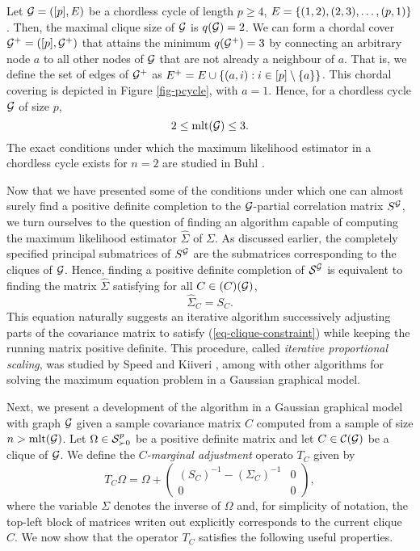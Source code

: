 \begin{example} \label{ex-pcycle}
    Let $\G = ([p], E)$ be a chordless cycle of length $p \geq 4$, $E = \eset{ (1, 2), (2, 3), \ldots, (p, 1)}$. Then, the maximal clique size of $\G$ is $q(\G) = 2$. We can form a chordal cover $\G^+ = ([p], \G^+)$ that attains the minimum $q(\G^+) = 3$ by connecting an arbitrary node $a$ to all other nodes of $\G$ that are not already a neighbour of $a$. That is, we define the set of edges of $\G^+$ as $E^+ = E \cup \eset{ (a, i) : i \in [p] \setminus \eset{a}}$. This chordal covering is depicted in Figure \ref{fig-pcycle}, with $a = 1$. Hence, for a chordless cycle $\G$ of size $p$,
    \begin{equation*}
        2 \leq \t{mlt}(\G) \leq 3.
    \end{equation*}
    The exact conditions under which the maximum likelihood estimator in a chordless cycle exists for $n = 2$ are studied in Buhl \cite[Section 4]{Buhl1993OnTE}.
\end{example}


Now that we have presented some of the conditions under which one can almost surely find a positive definite completion to the $\G$-partial correlation matrix $S^\G$, we turn ourselves to the question of finding an algorithm capable of computing the maximum likelihood estimator $\hat\Sigma$ of $\Sigma$. As discussed earlier, the completely specified principal submatrices of $S^\G$ are the submatrices corresponding to the cliques of $\G$. Hence, finding a positive definite completion of $\S^\G$ is equivalent to finding the matrix $\hat\Sigma$ satisfying for all $C \in \c(C)(\G)$,
\begin{equation} \label{eq-clique-constraint}
    \hat\Sigma_C = S_C.
\end{equation}
This equation naturally suggests an iterative algorithm successively adjusting parts of the covariance matrix to satisfy (\ref{eq-clique-constraint}) while keeping the running matrix positive definite. This procedure, called \textit{iterative proportional scaling}, was studied by Speed and Kiiveri \cite{speed1986gaussian}, among with other algorithms for solving the maximum equation problem in a Gaussian graphical model. 

Next, we present a development of the algorithm in a Gaussian graphical model with graph $\G$ given a sample covariance matrix $C$ computed from a sample of size $n > \t{mlt}(\G)$. Let $\Omega \in \S^p_{\succ 0}$ be a positive definite matrix and let $C \in \c{C}(\G)$ be a clique of $\G$. We define the \textit{$C$-marginal adjustment} operato $T_C$ given by
\begin{equation} \label{eq-tc-1}
    T_C \Omega = \Omega + \begin{pmatrix}
        (S_C)^{-1} - (\Sigma_C)^{-1} & 0\\
        0 & 0 
        \end{pmatrix},
\end{equation}
where the variable $\Sigma$ denotes the inverse of $\Omega$ and, for simplicity of notation, the top-left block of matrices writen out explicitly corresponds to the current clique $C$. We now show that the operator $T_C$ satisfies the following useful properties.



